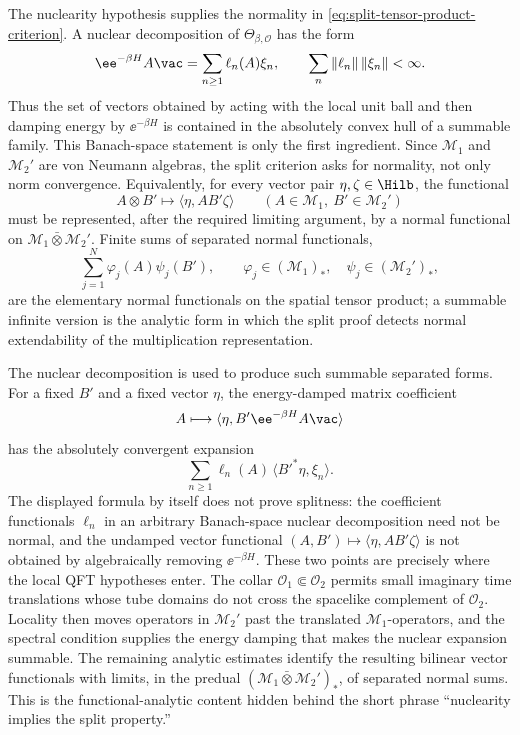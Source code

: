 The nuclearity hypothesis supplies the normality in
\eqref{eq:split-tensor-product-criterion}.  A nuclear decomposition of
\(\Theta_{\beta,\mathcal O}\) has the form
\[
  \ee^{-\beta H}A\vac
  =
  \sum_{n\ge1}\ell_n(A)\xi_n,
  \qquad
  \sum_n\|\ell_n\|\,\|\xi_n\|<\infty .
\]
Thus the set of vectors obtained by acting with the local unit ball and then
damping energy by \(\ee^{-\beta H}\) is contained in the absolutely convex
hull of a summable family.  This Banach-space statement is only the first
ingredient.  Since \(\mathcal M_1\) and \(\mathcal M_2'\) are von Neumann
algebras, the split criterion asks for normality, not only norm convergence.
Equivalently, for every vector pair \(\eta,\zeta\in\Hilb\), the functional
\[
  A\otimes B'
  \longmapsto
  \langle\eta,AB'\zeta\rangle
  \qquad
  (A\in\mathcal M_1,\ B'\in\mathcal M_2')
\]
must be represented, after the required limiting argument, by a normal
functional on \(\mathcal M_1\bar\otimes\mathcal M_2'\).  Finite sums of
separated normal functionals,
\[
  \sum_{j=1}^N\varphi_j(A)\psi_j(B'),
  \qquad
  \varphi_j\in(\mathcal M_1)_*,\quad
  \psi_j\in(\mathcal M_2')_*,
\]
are the elementary normal functionals on the spatial tensor product; a
summable infinite version is the analytic form in which the split proof
detects normal extendability of the multiplication representation.

The nuclear decomposition is used to produce such summable separated forms.
For a fixed \(B'\) and a fixed vector \(\eta\), the energy-damped matrix
coefficient
\[
  A\longmapsto
  \langle\eta,B'\ee^{-\beta H}A\vac\rangle
\]
has the absolutely convergent expansion
\[
  \sum_{n\ge1}\ell_n(A)\,\langle B'^*\eta,\xi_n\rangle .
\]
The displayed formula by itself does not prove splitness: the coefficient
functionals \(\ell_n\) in an arbitrary Banach-space nuclear decomposition need
not be normal, and the undamped vector functional
\((A,B')\mapsto\langle\eta,AB'\zeta\rangle\) is not obtained by algebraically
removing \(\ee^{-\beta H}\).  These two points are precisely where the local
QFT hypotheses enter.  The collar \(\mathcal O_1\Subset\mathcal O_2\) permits
small imaginary time translations whose tube domains do not cross the
spacelike complement of \(\mathcal O_2\).  Locality then moves operators in
\(\mathcal M_2'\) past the translated \(\mathcal M_1\)-operators, and the
spectral condition supplies the energy damping that makes the nuclear
expansion summable.  The remaining analytic estimates identify the resulting
bilinear vector functionals with limits, in the predual
\((\mathcal M_1\bar\otimes\mathcal M_2')_*\), of separated normal sums.  This
is the functional-analytic content hidden behind the short phrase
``nuclearity implies the split property.''

